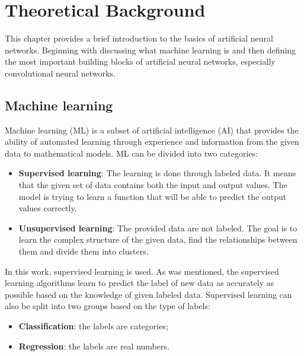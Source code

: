 \documentclass[thesis=B,english]{FITthesis}[2019/12/23]
\begin{document}

\chapter{Theoretical Background}
\label{chap:theoretical_background}
This chapter provides a brief introduction to the basics of artificial neural networks. Beginning with discussing what machine learning is and then defining the most important building blocks of artificial neural networks, especially convolutional neural networks.
\section{Machine learning}
Machine learning (ML) is a subset of artificial intelligence (AI) that provides the ability of automated learning through experience and information from the given data to mathematical models. ML can be divided into two categories:

\begin{itemize}
	\item \textbf{Supervised learning}: The learning is done through labeled data. It means that the given set of data contains both the input and output values. The model is trying to learn a function that will be able to predict the output values correctly.
	\item \textbf{Unsupervised learning}: The provided data are not labeled. The goal is to learn the complex structure of the given data, find the relationships between them and divide them into clusters.
\end{itemize}

In this work, supervised learning is used. As was mentioned, the supervised learning algorithms learn to predict the label of new data as accurately as possible based on the knowledge of given labeled data. Supervised learning can also be split into two groups based on the type of labels:

\begin{itemize}
	\item \textbf{Classification}: the labels are categories;
	\item \textbf{Regression}: the labels are real numbers.
\end{itemize}
\end{document}
